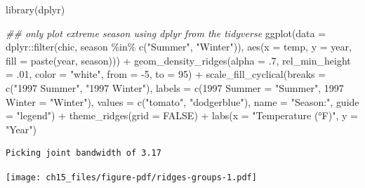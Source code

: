 \documentclass[
  letterpaper,
  DIV=11,
  numbers=noendperiod]{scrreprt}
\newenvironment{Shaded}{\begin{snugshade}}{\end{snugshade}}
\newcommand{\AttributeTok}[1]{\textcolor[rgb]{0.40,0.45,0.13}{#1}}
\newcommand{\ConstantTok}[1]{\textcolor[rgb]{0.56,0.35,0.01}{#1}}
\newcommand{\DecValTok}[1]{\textcolor[rgb]{0.68,0.00,0.00}{#1}}
\newcommand{\DocumentationTok}[1]{\textcolor[rgb]{0.37,0.37,0.37}{\textit{#1}}}
\newcommand{\FunctionTok}[1]{\textcolor[rgb]{0.28,0.35,0.67}{#1}}
\newcommand{\NormalTok}[1]{\textcolor[rgb]{0.00,0.23,0.31}{#1}}
\newcommand{\OtherTok}[1]{\textcolor[rgb]{0.00,0.23,0.31}{#1}}
\newcommand{\SpecialCharTok}[1]{\textcolor[rgb]{0.37,0.37,0.37}{#1}}
\newcommand{\StringTok}[1]{\textcolor[rgb]{0.13,0.47,0.30}{#1}}
\begin{document}
\begin{Shaded}
\begin{Highlighting}[]
\FunctionTok{library}\NormalTok{(dplyr)}

\DocumentationTok{\#\# only plot extreme season using dplyr from the tidyverse}
\FunctionTok{ggplot}\NormalTok{(}\AttributeTok{data =}\NormalTok{ dplyr}\SpecialCharTok{::}\FunctionTok{filter}\NormalTok{(chic, season }\SpecialCharTok{\%in\%} \FunctionTok{c}\NormalTok{(}\StringTok{"Summer"}\NormalTok{, }\StringTok{"Winter"}\NormalTok{)),}
         \FunctionTok{aes}\NormalTok{(}\AttributeTok{x =}\NormalTok{ temp, }\AttributeTok{y =}\NormalTok{ year, }\AttributeTok{fill =} \FunctionTok{paste}\NormalTok{(year, season))) }\SpecialCharTok{+}
  \FunctionTok{geom\_density\_ridges}\NormalTok{(}\AttributeTok{alpha =}\NormalTok{ .}\DecValTok{7}\NormalTok{, }\AttributeTok{rel\_min\_height =}\NormalTok{ .}\DecValTok{01}\NormalTok{,}
                      \AttributeTok{color =} \StringTok{"white"}\NormalTok{, }\AttributeTok{from =} \SpecialCharTok{{-}}\DecValTok{5}\NormalTok{, }\AttributeTok{to =} \DecValTok{95}\NormalTok{) }\SpecialCharTok{+}
  \FunctionTok{scale\_fill\_cyclical}\NormalTok{(}\AttributeTok{breaks =} \FunctionTok{c}\NormalTok{(}\StringTok{"1997 Summer"}\NormalTok{, }\StringTok{"1997 Winter"}\NormalTok{),}
                      \AttributeTok{labels =} \FunctionTok{c}\NormalTok{(}\StringTok{\textasciigrave{}}\AttributeTok{1997 Summer}\StringTok{\textasciigrave{}} \OtherTok{=} \StringTok{"Summer"}\NormalTok{,}
                                 \StringTok{\textasciigrave{}}\AttributeTok{1997 Winter}\StringTok{\textasciigrave{}} \OtherTok{=} \StringTok{"Winter"}\NormalTok{),}
                      \AttributeTok{values =} \FunctionTok{c}\NormalTok{(}\StringTok{"tomato"}\NormalTok{, }\StringTok{"dodgerblue"}\NormalTok{),}
                      \AttributeTok{name =} \StringTok{"Season:"}\NormalTok{, }\AttributeTok{guide =} \StringTok{"legend"}\NormalTok{) }\SpecialCharTok{+}
  \FunctionTok{theme\_ridges}\NormalTok{(}\AttributeTok{grid =} \ConstantTok{FALSE}\NormalTok{) }\SpecialCharTok{+}
  \FunctionTok{labs}\NormalTok{(}\AttributeTok{x =} \StringTok{"Temperature (°F)"}\NormalTok{, }\AttributeTok{y =} \StringTok{"Year"}\NormalTok{)}
\end{Highlighting}
\end{Shaded}

\begin{verbatim}
Picking joint bandwidth of 3.17
\end{verbatim}

\texttt{[image: ch15\_files/figure-pdf/ridges-groups-1.pdf]}
\end{document}
